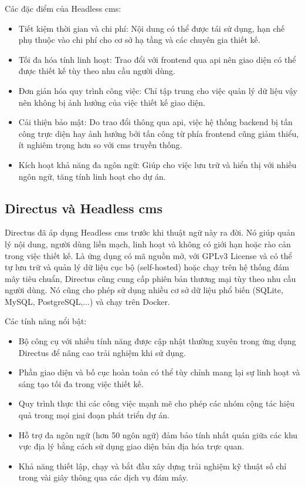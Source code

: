 \documentclass[./../main.tex]{subfiles}
\begin{document}
Các đặc điểm của Headless \acrshort{cms}:
\begin{itemize}
    \item Tiết kiệm thời gian và chi phí: Nội dung có thể được tái sử dụng, hạn chế phụ thuộc vào chi phí cho cơ sở hạ tầng và các chuyên gia thiết kế.
    \item Tối đa hóa tính linh hoạt: Trao đổi với frontend qua \acrshort{api} nên giao diện có thể được thiết kế tùy theo nhu cầu người dùng.
    \item Đơn giản hóa quy trình công việc: Chỉ tập trung cho việc quản lý dữ liệu vậy nên không bị ảnh hưởng của việc thiết kế giao diện.
    \item Cải thiện bảo mật: Do trao đổi thông qua \acrshort{api}, việc hệ thống backend bị tấn công trực diện hay ảnh hưởng bởi tấn công từ phía frontend cũng giảm thiểu, ít nghiêm trọng hơn so với \acrshort{cms} truyền thống.
    \item Kích hoạt khả năng đa ngôn ngữ: Giúp cho việc lưu trữ và hiển thị với nhiều ngôn ngữ, tăng tính linh hoạt cho dự án.
\end{itemize}

\subsection{Directus và Headless \acrshort{cms}}
Directus đã áp dụng Headless \acrshort{cms} trước khi thuật ngữ này ra đời. Nó giúp quản lý nội dung, người dùng liền mạch, linh hoạt và không có giới hạn hoặc rào cản trong việc thiết kế. Là ứng dụng có mã nguồn mở, với GPLv3 License và có thể tự lưu trữ và quản lý dữ liệu cục bộ (self-hosted) hoặc chạy trên hệ thống đám mây tiêu chuẩn, Directus cũng cung cấp phiên bản thương mại tùy theo nhu cầu người dùng. Nó cũng cho phép sử dụng nhiều cơ sở dữ liệu phổ biến (SQLite, MySQL, PostgreSQL,...) và chạy trên Docker. 

Các tính năng nổi bật:
\begin{itemize}
    \item Bộ công cụ với nhiều tính năng được cập nhật thường xuyên trong ứng dụng Directus để nâng cao trải nghiệm khi sử dụng.
    \item Phần giao diện và bố cục hoàn toàn có thể tùy chỉnh mang lại sự linh hoạt và sáng tạo tối đa trong việc thiết kế.
    \item Quy trình thực thi các công việc mạnh mẽ cho phép các nhóm cộng tác hiệu quả trong mọi giai đoạn phát triển dự án.
    \item Hỗ trợ đa ngôn ngữ (hơn 50 ngôn ngữ) đảm bảo tính nhất quán giữa các khu vực địa lý bằng cách sử dụng giao diện bản địa hóa trực quan.
    \item Khả năng thiết lập, chạy và bắt đầu xây dựng trải nghiệm kỹ thuật số chỉ trong vài giây thông qua các dịch vụ đám mây.
\end{itemize}
\end{document}
